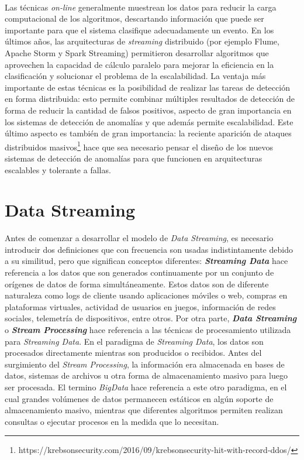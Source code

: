 \documentclass[a4paper,12pt, oneside]{article}
\begin{document}
\

Las técnicas \textit{on-line} generalmente muestrean los datos para reducir la carga computacional de los algoritmos, descartando información que puede ser importante para que el sistema clasifique adecuadamente un evento. En los últimos años, las arquitecturas de \textit{streaming} distribuido (por ejemplo Flume\cite{apacheflume}, Apache Storm\cite{apachestorm} y Spark Streaming\cite{apachespark}) permitieron desarrollar algoritmos que aprovechen la capacidad de cálculo paralelo para mejorar la eficiencia en la clasificación y solucionar el problema de la escalabilidad\cite{huang2014ld}. La ventaja más importante de estas técnicas es la posibilidad de realizar las tareas de detección en forma distribuida: esto permite combinar múltiples resultados de detección de forma de reducir la cantidad de falsos positivos, aspecto de gran importancia en los sistemas de detección de anomalías y que además permite escalabilidad. Este último aspecto es también de gran importancia: la reciente aparición de ataques distribuidos masivos\footnote{https://krebsonsecurity.com/2016/09/krebsonsecurity-hit-with-record-ddos/} hace que sea necesario pensar el diseño de los nuevos sistemas de detección de anomalías para que funcionen en arquitecturas escalables y tolerante a fallas.

\newpage

\section{Data Streaming}

Antes de comenzar a desarrollar el modelo de \textit{Data Streaming}, es necesario introducir dos definiciones que con frecuencia son usadas indistintamente debido a su similitud, pero que significan conceptos diferentes: \textbf{\textit{Streaming Data}} hace referencia a los datos que son generados continuamente por un conjunto de orígenes de datos de forma simultáneamente. Estos datos son de diferente naturaleza como logs de cliente usando aplicaciones móviles o web, compras en plataformas virtuales, actividad de usuarios en juegos, información de redes sociales, telemetría de dispositivos, entre otros. Por otra parte, \textbf{\textit{Data Streaming}} o \textbf{\textit{Stream Processing}} hace referencia a las técnicas de procesamiento utilizada para \textit{Streaming Data}. En el paradigma de \textit{Streaming Data}, los datos son procesados directamente mientras son producidos o recibidos. Antes del surgimiento del \textit{Stream Processing}, la información era almacenada en bases de datos, sistemas de archivos u otra forma de almacenamiento masivo para luego ser procesada. El termino \textit{BigData} hace referencia a este otro paradigma, en el cual grandes volúmenes de datos permanecen estáticos en algún soporte de almacenamiento masivo, mientras que diferentes algoritmos permiten realizan consultas o ejecutar procesos en la medida que lo necesitan.
\end{document}
